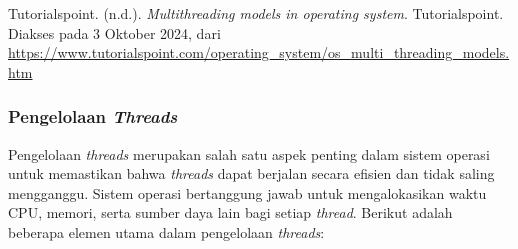 \documentclass[12pt]{article}
\begin{document}
\begin{enumerate}
\end{enumerate}

\noindent Tutorialspoint. (n.d.). \textit{Multithreading models in operating system}. Tutorialspoint. Diakses pada 3 Oktober 2024, dari \url{https://www.tutorialspoint.com/operating_system/os_multi_threading_models.htm}

\subsubsection{Pengelolaan \textit{Threads}}
Pengelolaan \textit{threads} merupakan salah satu aspek penting dalam sistem operasi untuk memastikan bahwa \textit{threads} dapat berjalan secara efisien dan tidak saling mengganggu. Sistem operasi bertanggung jawab untuk mengalokasikan waktu CPU, memori, serta sumber daya lain bagi setiap \textit{thread}. Berikut adalah beberapa elemen utama dalam pengelolaan \textit{threads}:
\end{document}
